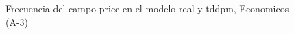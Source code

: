 \begin{figure}[H]
    \centering
    
    \caption{Frecuencia del campo  price en el modelo real y tddpm, Economicos (A-3)}
    \label{frecuency- Price-tddpm_mlp}
\end{figure}